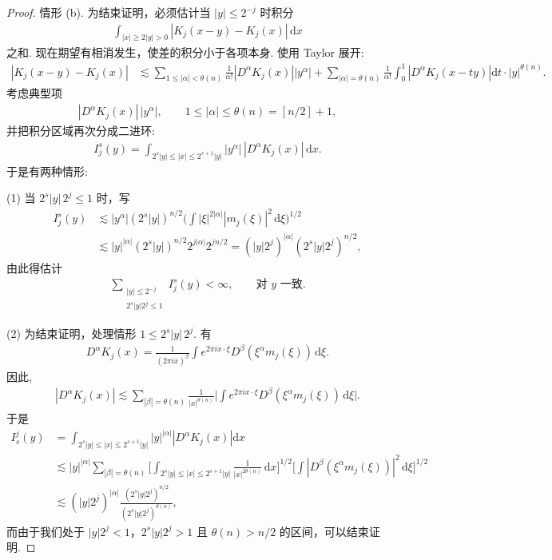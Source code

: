 \begin{proof}
情形 (b). 为结束证明，必须估计当 $|y| \leq 2^{-j}$ 时积分
\begin{align*}
  \int_{|x|\geq 2|y|>0}|K_{j}(x-y)-K_{j}(x)|\,\mathrm{d}x
\end{align*}
之和. 现在期望有相消发生，使差的积分小于各项本身. 使用 Taylor 展开:
\begin{align*}
  \left|K_{j}(x-y)-K_{j}(x)\right|
  &\lesssim\sum_{1\leq|\alpha|<\theta(n)}\frac{1}{\alpha!}\left|D^{\alpha}K_{j}(x)\right|\left|y^{\alpha}\right|
   +\sum_{|\alpha|=\theta(n)}\frac{1}{\alpha!}\int_{0}^{1}\left|D^{\alpha}K_{j}(x-ty)\right|\mathrm{d}t\cdot\left|y\right|^{\theta(n)}.
\end{align*}
考虑典型项
\begin{align*}
  |D^{\alpha}K_{j}(x)|\,|y^{\alpha}|,\qquad 1\leq|\alpha|\leq\theta(n)=[n/2]+1,
\end{align*}
并把积分区域再次分成二进环:
\begin{align*}
  I_{j}^{s}(y)=\int_{2^{s}|y|\leq|x|\leq 2^{s+1}|y|}|y^{\alpha}|\,|D^{\alpha}K_{j}(x)|\,\mathrm{d}x.
\end{align*}
于是有两种情形:

(1) 当 $2^s |y|\,2^j \leq 1$ 时，写
\begin{align*}
  I_{j}^{s}(y)
  &\lesssim|y^{\alpha}|\left(2^{s}|y|\right)^{n/2}\Big(\int|\xi|^{2|\alpha|}|m_{j}(\xi)|^{2}\,\mathrm{d}\xi\Big)^{1/2}\\
  &\lesssim|y|^{|\alpha|}\left(2^{s}|y|\right)^{n/2}2^{j|\alpha|}2^{jn/2}
  =\left(|y|2^{j}\right)^{|\alpha|}\left(2^{s}|y|2^{j}\right)^{n/2},
\end{align*}
由此得估计
\begin{align*}
  \sum_{\substack{|y|\leq 2^{-j}\\ 2^{s}|y|2^{j}\leq 1}}I_{j}^{s}(y)<\infty,\qquad \text{对 } y \text{ 一致}.
\end{align*}

(2) 为结束证明，处理情形 $1 \leq 2^s |y|\,2^j$. 有
\begin{align*}
  D^{\alpha}K_{j}(x)=\frac{1}{(2\pi i x)^{\beta}}\int e^{2\pi i x\cdot\xi}D^{\beta}(\xi^{\alpha}m_{j}(\xi))\,\mathrm{d}\xi.
\end{align*}
因此,
\begin{align*}
  |D^{\alpha}K_{j}(x)|\lesssim\sum_{|\beta|=\theta(n)}\frac{1}{|x|^{\theta(n)}}
  \Big|\int e^{2\pi i x\cdot\xi}D^{\beta}(\xi^{\alpha}m_{j}(\xi))\,\mathrm{d}\xi\Big|.
\end{align*}
于是
\begin{align*}
  I_{s}^{j}(y)
  &=\int_{2^{s}|y|\leq|x|\leq 2^{s+1}|y|}|y|^{|\alpha|}\left|D^{\alpha}K_{j}(x)\right|\mathrm{d}x\\
  &\lesssim|y|^{|\alpha|}\sum_{|\beta|=\theta(n)}
   \Big[\int_{2^{s}|y|\leq|x|\leq 2^{s+1}|y|}\frac{1}{|x|^{2\theta(n)}}\,\mathrm{d}x\Big]^{1/2}
   \Big[\int|D^{\beta}(\xi^{\alpha}m_{j}(\xi))|^{2}\,\mathrm{d}\xi\Big]^{1/2}\\
  &\lesssim(|y|2^{j})^{|\alpha|}\frac{(2^{s}|y|2^{j})^{n/2}}{(2^{s}|y|2^{j})^{\theta(n)}},
\end{align*}
而由于我们处于 $|y|2^j < 1$，$2^s |y|2^j > 1$ 且 $\theta(n) > n/2$ 的区间，可以结束证明.
\end{proof}

